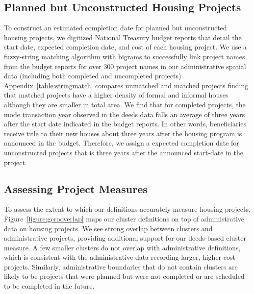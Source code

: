\documentclass[12pt]{article}
\begin{document}
\subsection{Planned but Unconstructed Housing Projects}




To construct an estimated completion date for planned but unconstructed housing projects, we digitized National Treasury budget reports that detail the start date, expected completion date, and cost of each housing project.  We use a fuzzy-string matching algorithm with bigrams to successfully link project names from the budget reports for over 300 project names in our administrative spatial data (including both completed and uncompleted projects).  Appendix~\ref{table:stringmatch} compares unmatched and matched projects finding that matched projects have a higher density of formal and informal houses although they are smaller in total area.  We find that for completed projects, the mode transaction year observed in the deeds data falls an average of three years after the start date indicated in the budget reports.  In other words, beneficiaries receive title to their new houses about three years after the housing program is announced in the budget.  Therefore, we assign a expected completion date for unconstructed projects that is three years after the announced start-date in the project.  


\subsection{Assessing Project Measures}

To assess the extent to which our definitions accurately measure housing projects, Figure~\ref{figure:gcrooverlap} maps our cluster definitions on top of administrative data on housing projects.  We see strong overlap between clusters and administrative projects, providing additional support for our deeds-based cluster measure.  A few smaller clusters do not overlap with administrative definitions, which is consistent with the administrative data recording larger, higher-cost projects.  Similarly, administrative boundaries that do not contain clusters are likely to be projects that were planned but were not completed or are scheduled to be completed in the future.
\end{document}
